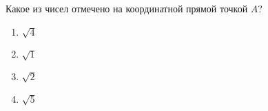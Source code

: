\begin{ex}
	Какое из чисел отмечено на координатной прямой точкой $A$?
	
	\selectanswer
	\begin{multicols}{4}
		\begin{enumerate}[label=\arabic*)]
			\item $\sqrt{4}$
			\item $\sqrt{1}$
			\item $\sqrt{2}$
			\item $\sqrt{5}$
		\end{enumerate}
	\end{multicols}
\end{ex}